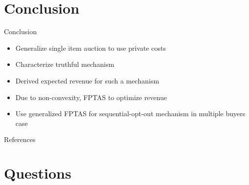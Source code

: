 \documentclass{beamer}
\begin{document}
\section{Conclusion}
\begin{frame}{Conclusion}
  \begin{itemize}
    \item Generalize single item auction to use private costs
    \item Characterize truthful mechanism
    \item Derived expected revenue for such a mechanism
    \item Due to non-convexity, FPTAS to optimize revenue
    \item Use generalized FPTAS for sequential-opt-out mechanism in multiple buyers case
  \end{itemize}
\end{frame}

\begin{frame}{References}
  \printbibliography[heading=none]
\end{frame}

\section{Questions \faQuestionCircle}
\end{document}
